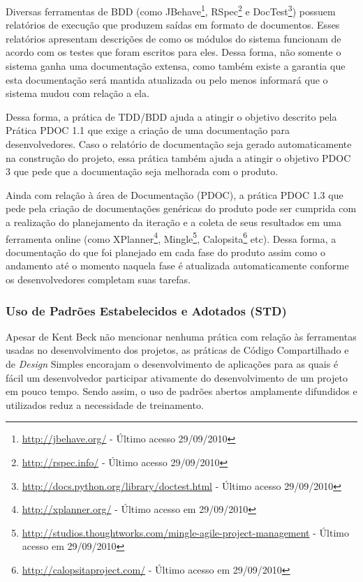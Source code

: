 Diversas ferramentas de BDD (como
JBehave\footnote{\url{http://jbehave.org/} - Último acesso
  29/09/2010}, RSpec\footnote{\url{http://rspec.info/} - Último acesso
  29/09/2010} e
DocTest\footnote{\url{http://docs.python.org/library/doctest.html} -
  Último acesso 29/09/2010}) possuem relatórios de execução que
produzem saídas em formato de documentos. Esses relatórios apresentam
descrições de como os módulos do sistema funcionam de acordo com os
testes que foram escritos para eles. Dessa forma, não somente o
sistema ganha uma documentação extensa, como também existe a garantia
que esta documentação será mantida atualizada ou pelo menos informará
que o sistema mudou com relação a ela.

Dessa forma, a prática de TDD/BDD ajuda a atingir o objetivo descrito
pela Prática PDOC 1.1 que exige a criação de uma documentação para
desenvolvedores. Caso o relatório de documentação seja gerado
automaticamente na construção do projeto, essa prática também ajuda a
atingir o objetivo PDOC 3 que pede que a documentação seja melhorada
com o produto.

Ainda com relação à área de Documentação (PDOC), a prática PDOC 1.3
que pede pela criação de documentações genéricas do produto pode ser
cumprida com a realização do planejamento da iteração e a coleta de
seus resultados em uma ferramenta online (como
XPlanner\footnote{\url{http://xplanner.org/} - Último acesso em
  29/09/2010},
Mingle\footnote{\url{http://studios.thoughtworks.com/mingle-agile-project-management}
  - Último acesso em 29/09/2010},
Calopsita\footnote{\url{http://calopsitaproject.com/} - Último acesso
  em 29/09/2010} etc). Dessa forma, a documentação do que foi
planejado em cada fase do produto assim como o andamento até o momento
naquela fase é atualizada automaticamente conforme os desenvolvedores
completam suas tarefas.

\subsubsection{Uso de Padrões Estabelecidos e Adotados (STD)}
\label{sec:+std}

Apesar de Kent Beck não mencionar nenhuma prática com relação às
ferramentas usadas no desenvolvimento dos projetos, as práticas de
Código Compartilhado e de \textit{Design} Simples encorajam o
desenvolvimento de aplicações para as quais é fácil um desenvolvedor
participar ativamente do desenvolvimento de um projeto em pouco
tempo. Sendo assim, o uso de padrões abertos amplamente difundidos e
utilizados reduz a necessidade de treinamento.

